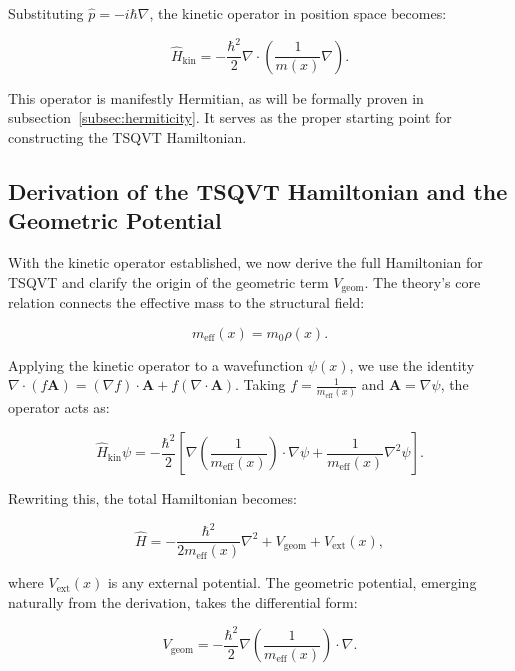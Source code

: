\documentclass[a4paper]{article}
\begin{document}
Substituting \( \hat{p} = -i\hbar \nabla \), the kinetic operator in position space becomes:

\begin{equation}
	\hat{H}_{\text{kin}} = -\frac{\hbar^2}{2} \nabla \cdot \left( \frac{1}{m(x)} \nabla \right).
\end{equation}

This operator is manifestly Hermitian, as will be formally proven in subsection~\ref{subsec:hermiticity}. It serves as the proper starting point for constructing the TSQVT Hamiltonian.

\subsection{Derivation of the TSQVT Hamiltonian and the Geometric Potential}

With the kinetic operator established, we now derive the full Hamiltonian for TSQVT and clarify the origin of the geometric term \( V_{\text{geom}} \). The theory’s core relation connects the effective mass to the structural field:

\begin{equation}
	m_{\text{eff}}(x) = m_0 \rho(x).
\end{equation}

Applying the kinetic operator to a wavefunction \( \psi(x) \), we use the identity \( \nabla \cdot (f \mathbf{A}) = (\nabla f) \cdot \mathbf{A} + f (\nabla \cdot \mathbf{A}) \). Taking \( f = \frac{1}{m_{\text{eff}}(x)} \) and \( \mathbf{A} = \nabla \psi \), the operator acts as:

\begin{equation}
	\hat{H}_{\text{kin}} \psi = -\frac{\hbar^2}{2} \left[ \nabla \left( \frac{1}{m_{\text{eff}}(x)} \right) \cdot \nabla \psi + \frac{1}{m_{\text{eff}}(x)} \nabla^2 \psi \right].
\end{equation}

Rewriting this, the total Hamiltonian becomes:

\begin{equation}
	\hat{H} = -\frac{\hbar^2}{2m_{\text{eff}}(x)} \nabla^2 + V_{\text{geom}} + V_{\text{ext}}(x),
\end{equation}

where \( V_{\text{ext}}(x) \) is any external potential. The geometric potential, emerging naturally from the derivation, takes the differential form:

\begin{equation}
	V_{\text{geom}} = -\frac{\hbar^2}{2} \nabla \left( \frac{1}{m_{\text{eff}}(x)} \right) \cdot \nabla.
\end{equation}
\end{document}
